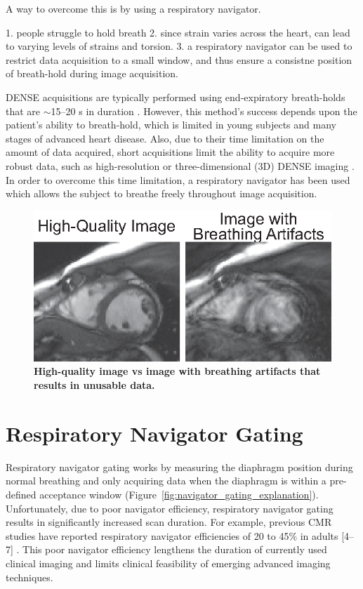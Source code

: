 	A way to overcome this is by using a respiratory navigator.
	
	1. people struggle to hold breath
	2. since strain varies across the heart, can lead to varying levels of strains and torsion.
	3. a respiratory navigator can be used to restrict data acquisition to a small window, and thus ensure a consistne position of breath-hold during image acquisition.
	
	
	DENSE acquisitions are typically performed using end-expiratory breath-holds that are $\sim$15--20 s in duration \cite{Kim2004,Zhong2006a,Ernande2012,Zhong2010a,Aletras2005,Spottiswoode2007,Young2012c}. However, this method's success depends upon the patient's ability to breath-hold, which is limited in young subjects and many stages of advanced heart disease. Also, due to their time limitation on the amount of data acquired, short acquisitions limit the ability to acquire more robust data, such as high-resolution \cite{Wehner2014} or three-dimensional (3D) DENSE imaging \cite{Zhong2010a,Kar2014,Auger2012}. In order to overcome this time limitation, a respiratory navigator has been used which allows the subject to breathe freely throughout image acquisition.
	
	 \begin{figure}
		\centering
		\includegraphics{figures/intro/good_bad_image_breathing_artifacts}
		\caption[High-quality image vs image with breathing artifacts that results in unusable data]{\textbf{High-quality image vs image with breathing artifacts that results in unusable data.}}
		\label{fig:good_bad_image_breathing_artifacts}
	\end{figure}

\section{Respiratory Navigator Gating}
	Respiratory navigator gating works by measuring the diaphragm position during normal breathing and only acquiring data when the diaphragm is within a pre-defined acceptance window (Figure~\ref{fig:navigator_gating_explanation}). Unfortunately, due to poor navigator efficiency, respiratory navigator gating results in significantly increased scan duration. For example, previous CMR studies have reported respiratory navigator efficiencies of 20 to 45\% in adults [4–7] \cite{Abd-Elmoniem2011,Feuerlein2009,Jhooti2011,Wang1996}. This poor navigator efficiency lengthens the duration of currently used clinical imaging and limits clinical feasibility of emerging advanced imaging techniques.
	

